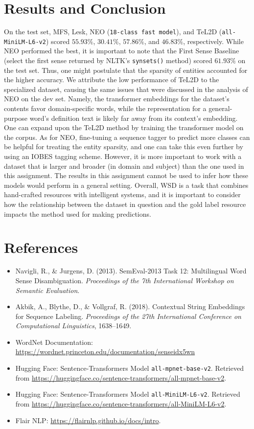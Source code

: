 \documentclass[11pt]{article}
\begin{document}
\vspace{-2ex}
\section{Results and Conclusion}
\vspace{-1ex}
On the test set, MFS, Lesk, NEO (\texttt{18-class fast model}), and TeL2D (\texttt{all-MiniLM-L6-v2}) 
scored $55.93\%$, $30.41\%$, $57.86\%$, and $46.83\%$, respectively.
While NEO performed the best, it is important to note that the First Sense Baseline (select the first sense returned by NLTK's \texttt{synsets()} method)
scored $61.93\%$ on the test set. Thus, one might postulate that the sparsity of entities 
accounted for the higher accuracy. We attribute the low performance of TeL2D to the 
specialized dataset, causing the same issues that were discussed in the analysis of NEO on the dev set.
Namely, the transformer embeddings for the dataset's contents favor domain-specific words, while the representation
for a general-purpose word's definition text is likely far away from its context's embedding.
One can expand upon the TeL2D method by training the transformer model on the corpus. As for NEO,
fine-tuning a sequence tagger to predict more classes can be helpful for treating the entity sparsity,
and one can take this even further by using an IOBES tagging scheme.
However, it is more important to work with a dataset that is larger and broader (in domain and subject) 
than the one used in this assignment. The results in this assignment cannot be used to infer 
how these models would perform in a general setting. Overall, WSD is a task that
combines hand-crafted resources with intelligent systems, and it is
important to consider how the relationship between the dataset in question
and the gold label resource impacts the method used for making predictions.

\section*{References}
\begin{itemize}
    \item Navigli, R., \& Jurgens, D. (2013). SemEval-2013 Task 12: Multilingual Word Sense Disambiguation. \emph{Proceedings of the 7th International Workshop on Semantic Evaluation}.
    \item Akbik, A., Blythe, D., \& Vollgraf, R. (2018). Contextual String Embeddings for Sequence Labeling. \emph{Proceedings of the 27th International Conference on Computational Linguistics}, 1638--1649.
    \item WordNet Documentation: \url{https://wordnet.princeton.edu/documentation/senseidx5wn}
    \item Hugging Face: Sentence-Transformers Model \texttt{all-mpnet-base-v2}. Retrieved from \url{https://huggingface.co/sentence-transformers/all-mpnet-base-v2}.
    \item Hugging Face: Sentence-Transformers Model \texttt{all-MiniLM-L6-v2}. Retrieved from \url{https://huggingface.co/sentence-transformers/all-MiniLM-L6-v2}.
    \item Flair NLP:  \url{https://flairnlp.github.io/docs/intro}.
\end{itemize}
\end{document}
